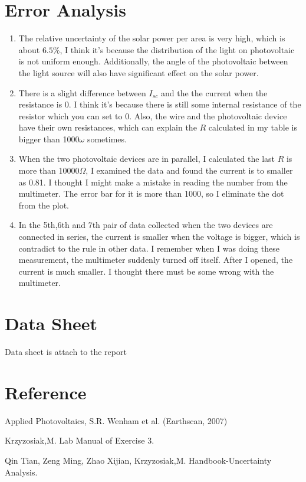 \documentclass[12pt]{article}
\begin{document}
\section{Error Analysis}
\begin{enumerate}
\item The relative uncertainty of the solar power per area is very high, which is about $6.5\%$, I think it's because the distribution of the light on photovoltaic is not uniform enough. Additionally, the angle of the photovoltaic between the light source will also have significant effect on the solar power.
\item There is a slight difference between $I_{sc}$ and the the current when the resistance is 0. I think it's because there is still some internal resistance of the resistor which you can set to 0. Also, the wire and the photovoltaic device have their own resistances, which can explain the $R$ calculated in my table is bigger than 1000$\omega$ sometimes.
\item When the two photovoltaic devices are in parallel, I calculated the last $R$ is more than 10000$\Omega$, I examined the data and found the current is to smaller as 0.81. I thought I might make a mistake in reading the number from the multimeter. The error bar for it is more than 1000, so I eliminate the dot from the plot.
\item In the 5th,6th and 7th pair of data collected when the two devices are connected in series, the current is smaller when the voltage is bigger, which is contradict to the rule in other data. I remember when I was doing these measurement, the multimeter suddenly turned off itself. After I opened, the current is much smaller. I thought there must be some wrong with the multimeter.
\end{enumerate} 
\section{Data Sheet}
Data sheet is attach to the report
\section{Reference}
\par Applied Photovoltaics, S.R. Wenham et al. (Earthscan, 2007)
\par Krzyzosiak,M. Lab Manual of Exercise 3.
\par Qin Tian, Zeng Ming, Zhao Xijian, Krzyzosiak,M. Handbook-Uncertainty Analysis.
\end{document}
